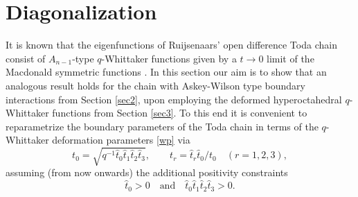 \documentclass[reqno]{amsart}
\theoremstyle{remark}
\numberwithin{equation}{section}
\begin{document}
\section{Diagonalization}\label{sec4}
It is known that the eigenfunctions of Ruijsenaars' open difference Toda chain consist of $A_{n-1}$-type  $q$-Whittaker functions given by a $t\to 0$ limit of the Macdonald symmetric functions \cite{ger-leb-obl:q-deformed}.
In this section our aim is to show that an analogous result holds for the chain with Askey-Wilson type boundary interactions from Section \ref{sec2}, upon employing the deformed hyperoctahedral $q$-Whittaker functions from Section \ref{sec3}.
To this end it is convenient to reparametrize the boundary parameters of the Toda chain in terms of the $q$-Whittaker deformation parameters \eqref{wp}  via
\begin{equation}\label{tp1}
t_0=\sqrt{q^{-1}\hat{t}_0\hat{t}_1\hat{t}_2\hat{t}_3},\qquad
t_r=\hat{t}_r\hat{t}_0/t_0\quad (r=1,2,3),
\end{equation}
assuming (from now onwards) the additional positivity constraints
\begin{equation}\label{tp2}
\hat{t}_0>0\quad \text{and}\quad \hat{t}_0\hat{t}_1\hat{t}_2\hat{t}_3>0.
\end{equation}
\end{document}
